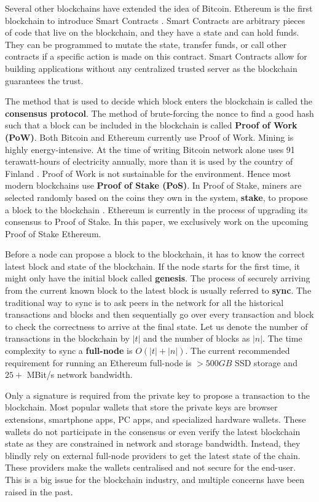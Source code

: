 \documentclass[a4paper,11pt,oneside]{article}
\theoremstyle{definition}
\begin{document}
  Several other blockchains have extended the idea of Bitcoin. Ethereum is the first blockchain to introduce Smart Contracts \cite{Ethereum}. Smart Contracts are arbitrary pieces of code that live on the blockchain, and they have a state and can hold funds. They can be programmed to mutate the state, transfer funds, or call other contracts if a specific action is made on this contract. Smart Contracts allow for building applications without any centralized trusted server as the blockchain guarantees the trust.        
  
  The method that is used to decide which block enters the blockchain is called the \textbf{consensus protocol}. The method of brute-forcing the nonce to find a good hash such that a block can be included in the blockchain is called \textbf{Proof of Work (PoW)}. Both Bitcoin and Ethereum currently use Proof of Work. Mining is highly energy-intensive. At the time of writing Bitcoin network alone uses 91 terawatt-hours of electricity annually, more than it is used by the country of Finland \cite{BitcoinNYTimes}. Proof of Work is not sustainable for the environment. Hence most modern blockchains use \textbf{Proof of Stake (PoS)}. In Proof of Stake, miners are selected randomly based on the coins they own in the system, \textbf{stake}, to propose a block to the blockchain \cite{Ouroboros}. Ethereum is currently in the process of upgrading its consensus to Proof of Stake. In this paper, we exclusively work on the upcoming Proof of Stake Ethereum.  
  
  Before a node can propose a block to the blockchain, it has to know the correct latest block and state of the blockchain. If the node starts for the first time, it might only have the initial block called \textbf{genesis}. The process of securely arriving from the current known block to the latest block is usually referred to \textbf{sync}. The traditional way to sync is to ask peers in the network for all the historical transactions and blocks and then sequentially go over every transaction and block to check the correctness to arrive at the final state. Let us denote the number of transactions in the blockchain by $|t|$ and the number of blocks as $|n|$. The time complexity to sync a \textbf{full-node} is \textbf{$O(|t| + |n|)$}.  The current recommended requirement for running an Ethereum full-node is $>500GB$ SSD storage and $25+$ MBit\slash s network bandwidth\cite{NodeRequirements}.   
  
 Only a signature is required from the private key to propose a transaction to the blockchain. Most popular wallets that store the private keys are browser extensions, smartphone apps, PC apps, and specialized hardware wallets. These wallets do not participate in the consensus or even verify the latest blockchain state as they are constrained in network and storage bandwidth. Instead, they blindly rely on external full-node providers to get the latest state of the chain. These providers make the wallets centralised and not secure for the end-user. This is a big issue for the blockchain industry, and multiple concerns have been raised in the past\cite{moxie}.
  
\end{document}
